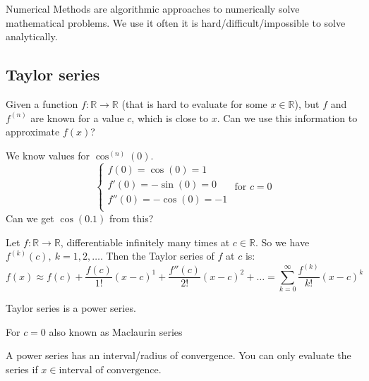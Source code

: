 
\begin{definition}
    Numerical Methods are algorithmic approaches to numerically solve mathematical problems.
    We use it often it is hard/difficult/impossible to solve analytically.
\end{definition}

\subsection{Taylor series}
Given a function $f : \mathbb{R} \to \mathbb{R}$
(that is hard to evaluate for some $x \in \mathbb{R}$),
but $f$ and $f^{(n)}$ are known for a value $c$, which is close to $x$.
Can we use this information to approximate $f(x)$?

We know values for $\cos^{(n)}(0)$.
\[
    \begin{cases}
        f(0) = \cos(0) = 1\\
        f'(0) = -\sin(0) = 0\\
        f''(0) = -\cos(0) = -1\\
    \end{cases} \text{ for } c = 0
\]
Can we get $\cos(0.1)$ from this?

\begin{definition}
    Let $f : \mathbb{R} \to \mathbb{R}$, differentiable 
    infinitely many times at $c \in \mathbb{R}$.
    So we have $f^{(k)}(c),\ k=1,2,\dots $. Then the Taylor series of $f$ at $c$ is:
    \[
        f(x) \approx f(c) + \frac{f(c)}{1!}(x-c)^1 + \frac{f''(c)}{2!}(x-c)^2 + \dots =
        \sum_{k=0}^{\infty} \frac{f^{(k)}}{k!} (x - c)^k
    \]
\end{definition}

\begin{remark}
    Taylor series is a power series.
\end{remark}

\begin{remark}
    For $c = 0$ also known as Maclaurin series
\end{remark}

\begin{remark}
    A power series has an interval/radius of convergence.
    You can only evaluate the series if $x \in \text{interval of convergence}$.
\end{remark}

